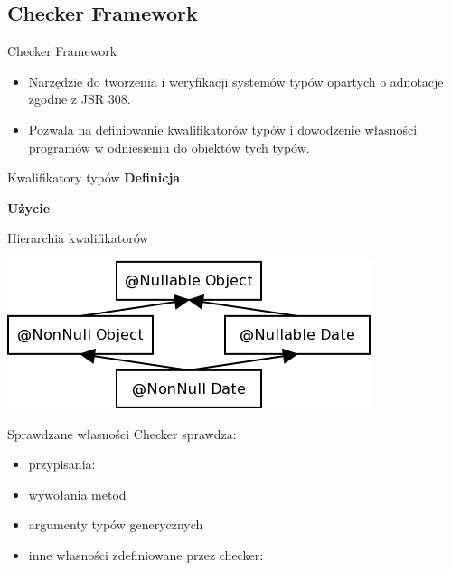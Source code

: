 \documentclass{beamer}
\begin{document}
\subsection{Checker Framework}

\begin{frame}{Checker Framework}
  \begin{itemize}
  \item Narzędzie do tworzenia i weryfikacji systemów typów 
    opartych o adnotacje zgodne z JSR 308.
  \item Pozwala na definiowanie kwalifikatorów typów i dowodzenie
    własności programów w odniesieniu do obiektów tych typów.
  \end{itemize}
\end{frame}

\begin{frame}{Kwalifikatory typów}
  \textbf{Definicja}
  
  \textbf{Użycie}
  
\end{frame}
  
\begin{frame}{Hierarchia kwalifikatorów}
  
  \begin{center}
    \includegraphics[scale=0.5]{img/nullness.png}
  \end{center}
\end{frame}

\begin{frame}{Sprawdzane własności}
  Checker sprawdza:
  \begin{itemize}
  \item<1-> przypisania:
    
  \item<2-> wywołania metod
  \item<2-> argumenty typów generycznych
  \item<3-> inne własności zdefiniowane przez checker:
    
  \end{itemize}
\end{frame}
\end{document}
